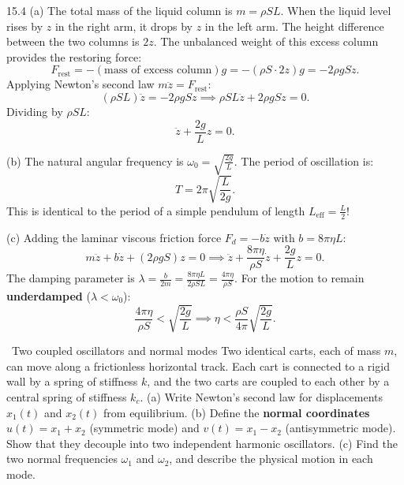 \begin{solution}{15.4}
(a) The total mass of the liquid column is $m = \rho S L$.
When the liquid level rises by $z$ in the right arm, it drops by $z$ in the left arm.
The height difference between the two columns is $2z$.
The unbalanced weight of this excess column provides the restoring force:
\[
F_{\text{rest}} = -(\text{mass of excess column})g = -(\rho S\cdot 2z)g = -2\rho g S z.
\]
Applying Newton's second law $m\ddot{z} = F_{\text{rest}}$:
\[
(\rho S L)\ddot{z} = -2\rho g S z \implies \rho S L\ddot{z} + 2\rho g S z = 0.
\]
Dividing by $\rho S L$:
\[
\boxed{\ddot{z} + \frac{2g}{L}z = 0.}
\]

(b) The natural angular frequency is $\omega_0 = \sqrt{\frac{2g}{L}}$.
The period of oscillation is:
\[
\boxed{T = 2\pi\sqrt{\frac{L}{2g}}.}
\]
This is identical to the period of a simple pendulum of length $L_{\text{eff}} = \frac{L}{2}$!

(c) Adding the laminar viscous friction force $F_d = -b\dot{z}$ with $b = 8\pi\eta L$:
\[
m\ddot{z} + b\dot{z} + (2\rho g S)z = 0 \implies \ddot{z} + \frac{8\pi\eta}{\rho S}\dot{z} + \frac{2g}{L}z = 0.
\]
The damping parameter is $\lambda = \frac{b}{2m} = \frac{8\pi\eta L}{2\rho S L} = \frac{4\pi\eta}{\rho S}$.
For the motion to remain \textbf{underdamped} ($\lambda < \omega_0$):
\[
\frac{4\pi\eta}{\rho S} < \sqrt{\frac{2g}{L}} \implies \boxed{\eta < \frac{\rho S}{4\pi}\sqrt{\frac{2g}{L}}.}
\]
\end{solution}

\begin{exercise}{\mastery\ Two coupled oscillators and normal modes}
Two identical carts, each of mass $m$, can move along a frictionless horizontal track. Each cart is connected to a rigid wall by a spring of stiffness $k$, and the two carts are coupled to each other by a central spring of stiffness $k_c$.
(a) Write Newton's second law for displacements $x_1(t)$ and $x_2(t)$ from equilibrium.
(b) Define the \textbf{normal coordinates} $u(t) = x_1 + x_2$ (symmetric mode) and $v(t) = x_1 - x_2$ (antisymmetric mode). Show that they decouple into two independent harmonic oscillators.
(c) Find the two normal frequencies $\omega_1$ and $\omega_2$, and describe the physical motion in each mode.
\end{exercise}

\begin{tabletworkspace}[6.5cm]
\end{tabletworkspace}

